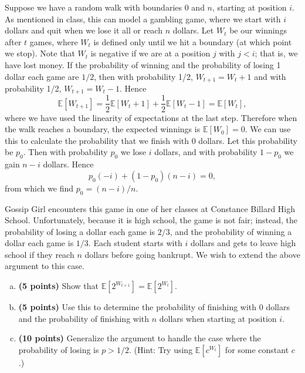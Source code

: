 \documentclass[11pt,letterpaper]{article}
\begin{document}
\pagebreak
\begin{problem}
    Suppose we have a random walk with boundaries 0 and $n$, starting at position $i$.  As mentioned in class, this can model a gambling game, where we start with $i$ dollars and quit when we lose it all or reach $n$ dollars. Let $W_t$ be our winnings after $t$ games, where $W_t$ is defined only until we hit a boundary (at which point we stop). Note that $W_t$ is negative if we are at a position $j$ with $j < i$; that is, we have lost money. If the probability of winning and the probability of losing 1 dollar each game are $1/2$, then with probability 1/2, $W_{t+1} = W_t + 1$ and with probability 1/2, $W_{t+1} = W_t - 1$. Hence $$\mathbb{E}[W_{t+1}] = {\frac12} \mathbb{E}[W_{t}+1] + {\frac12} \mathbb{E}[W_{t}-1] =  \mathbb{E}[W_{t}],$$ where we have used the linearity of expectations at the last step. Therefore when the walk reaches a boundary, the expected winnings is $\mathbb{E}[W_{0}] = 0$.  We can use this to calculate the probability that we finish with 0 dollars.  Let this probability be $p_0$. Then with probability $p_0$ we lose $i$ dollars, and with probability $1 - p_0$ we gain $n-i$ dollars. Hence $$p_0 (-i) + (1 - p_0) (n-i) = 0,$$ from which we find $p_0 = (n-i)/n$.  

    Gossip Girl encounters this game in one of her classes at Constance Billard High School.  Unfortunately, because it is high school, the game is not fair; instead, the probability of losing a dollar each game is $2/3$, and the probability of winning a dollar each game is $1/3$.  Each student starts with $i$ dollars and gets to leave high school if they reach $n$ dollars before going bankrupt. We wish to extend the above argument to this case.  

    \begin{enumerate}[(a)]
        \item {\bf (5 points)} Show that $\mathbb{E}[2^{W_{t+1}}] = \mathbb{E}[2^{W_{t}}]$.  
        \item {\bf (5 points)} Use this to determine the probability of finishing with 0 dollars and the probability of finishing with $n$ dollars when starting at position $i$.  
        \item {\bf (10 points)} Generalize the argument to handle the case where the probability of losing is $p > 1/2$.  (Hint: Try using $\mathbb{E}[c^{W_{t}}]$ for some constant $c$.)
    \end{enumerate}
\end{problem}
\end{document}
